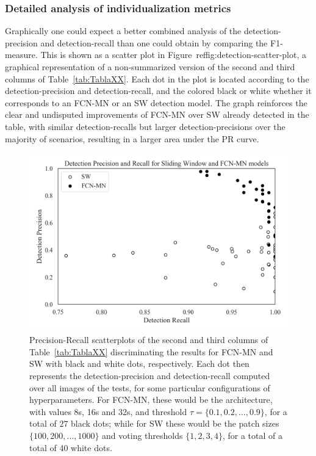 \documentclass[a4paper,authoryear,review]{elsarticle}
\begin{document}
\subsubsection{Detailed analysis of individualization metrics} 
\label{sub:compFCNSW}


Graphically one could expect a better combined analysis of the detection-precision and detection-recall than one could obtain by comparing the F1-measure. This is shown as a scatter plot in Figure~ref{fig:detection-scatter-plot}, a graphical representation of a non-summarized version of the second and third columns of Table~\ref{tab:TablaXX}. Each dot  in the plot is located according to the detection-precision and detection-recall, and the colored black or white whether it corresponds to an FCN-MN or an SW detection model.
%
The graph reinforces the clear and undisputed improvements of FCN-MN over SW already detected in the table, with similar detection-recalls but larger detection-precisions over the majority of scenarios, resulting in a larger area under the PR curve. 

 \begin{figure}
	\centering
	\includegraphics[width=\textwidth]{figures/111_precision_recall_detection.png}
	\caption{Precision-Recall scatterplots of the second and third columns of Table~\ref{tab:TablaXX} discriminating the results for FCN-MN and SW with black and white dots, respectively. Each dot then  represents the detection-precision and detection-recall computed over all images of the tests, for some particular  configurations of hyperparameters. For FCN-MN, these would be the architecture, with values 8s, 16s and 32s, and threshold $\tau = \{0.1, 0.2, \ldots, 0.9\}$,  for a total of $27$ black dots; while for SW these would be the patch sizes  $\{100, 200, \ldots, 1000\}$ and voting thresholds $\{1, 2, 3, 4\}$, for a total of a total of 40 white dots.}
	\label{fig:detection-scatter-plot}
\end{figure}
\end{document}
